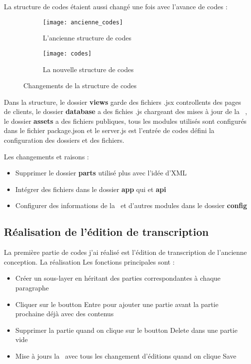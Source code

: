 La structure de codes étaient aussi changé une fois avec l'avance de codes :

\begin{figure}[H] 
\begin{subfigure}{0.5\textwidth}
\texttt{[image: ancienne\_codes]} 
\caption{L'ancienne structure de codes}
\label{fig:subim1}
\end{subfigure}
\begin{subfigure}{0.5\textwidth}
\texttt{[image: codes]}
\caption{La nouvelle structure de codes}
\label{fig:subim2}
\end{subfigure} 
\caption{Changements de la structure de codes}
\label{fig:image2}
\end{figure}

Dans la structure, le dossier \textbf{views} garde des fichiers .jsx controllents des pages de clients, le dossier \textbf{database} a des fichies .js chargeant des mises à jour de la \db\ , le dossier \textbf{assets} a des fichiers publiques, tous les modules utilisés sont configurés dans le fichier package.json et le server.js est l'entrée de codes défini la configuration des dossiers et des fichiers.

Les changements et raisons :

\begin{itemize}
    \item Supprimer le dossier \textbf{parts} utilisé plus avec l'idée d'XML
    \item Intégrer des fichiers dans le dossier \textbf{app} qui  et \textbf{api}
    \item Configurer des informations de la \db\ et d'autres modules dans le dossier \textbf{config}
\end{itemize}


\subsection{Réalisation de l'édition de transcription}

La première partie de codes j'ai réalisé est l'édition de transcription de l'ancienne conception. La réalisation  Les fonctions principales sont :

\begin{itemize}
    \item Créer un sous-layer en héritant des parties correspondantes à chaque paragraphe
    \item Cliquer sur le boutton Entre pour ajouter une partie avant la partie prochaine déjà avec des contenus
    \item Supprimer la partie quand on clique sur le boutton Delete dans une partie vide
    \item Mise à jours la \db\ avec tous les changement d'éditions quand on clique Save
\end{itemize}

